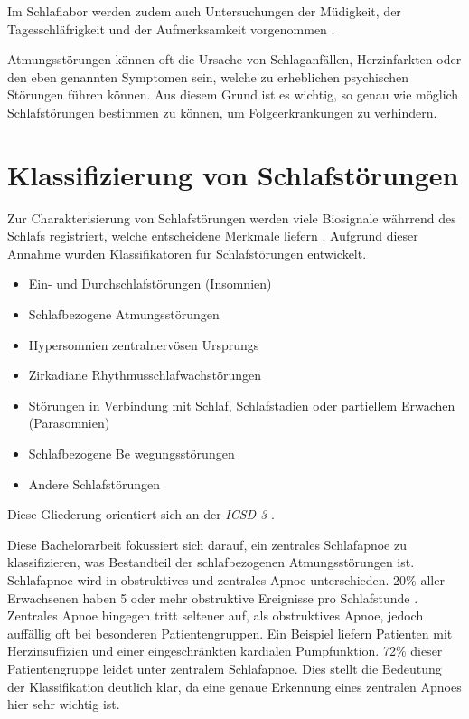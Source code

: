 Im Schlaflabor werden zudem auch Untersuchungen der Müdigkeit, der Tagesschläfrigkeit und der Aufmerksamkeit vorgenommen \cite{schlafmedizin_1x1}.

Atmungsstörungen können oft die Ursache von Schlaganfällen, Herzinfarkten oder den eben genannten Symptomen sein, welche zu erheblichen psychischen Störungen führen können.
Aus diesem Grund ist es wichtig, so genau wie möglich Schlafstörungen bestimmen zu können, um Folgeerkrankungen zu verhindern. 

\section{Klassifizierung von Schlafstörungen}
Zur Charakterisierung von Schlafstörungen werden viele Biosignale währrend des Schlafs registriert, welche entscheidene Merkmale liefern \cite{praxis_der_schlafmedizin}.
Aufgrund dieser Annahme wurden Klassifikatoren für Schlafstörungen entwickelt.
\begin{itemize}
    \item Ein- und Durchschlafstörungen (Insomnien)
    \item Schlafbezogene Atmungsstörungen
    \item Hypersomnien zentralnervösen Ursprungs
    \item Zirkadiane Rhythmusschlafwachstörungen
    \item Störungen in Verbindung mit Schlaf, Schlafstadien oder partiellem Erwachen (Parasomnien)
    \item Schlafbezogene Be wegungsstörungen
    \item Andere Schlafstörungen
\end{itemize}

Diese Gliederung orientiert sich an der \textit{ICSD-3} \cite{praxis_der_schlafmedizin}.


Diese Bachelorarbeit fokussiert sich darauf, ein zentrales Schlafapnoe zu klassifizieren, was Bestandteil der {\glqq schlafbezogenen Atmungsstörungen\grqq} ist.
Schlafapnoe wird in obstruktives und zentrales Apnoe unterschieden. 
20\% aller Erwachsenen haben 5 oder mehr obstruktive Ereignisse pro Schlafstunde \cite{schlafmedizin_1x1}.
Zentrales Apnoe hingegen tritt seltener auf, als obstruktives Apnoe, jedoch auffällig oft bei besonderen Patientengruppen. 
Ein Beispiel liefern Patienten mit Herzinsuffizien und einer eingeschränkten kardialen Pumpfunktion.
72\% dieser Patientengruppe leidet unter zentralem Schlafapnoe. Dies stellt die Bedeutung der Klassifikation deutlich klar, da eine genaue Erkennung eines zentralen Apnoes hier sehr wichtig ist.

